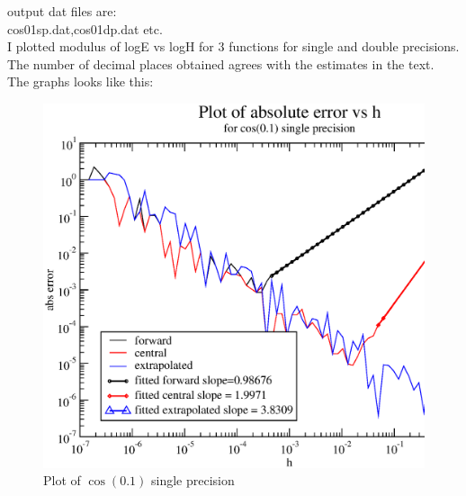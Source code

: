 \documentclass[11pt,a4paper,english]{article}
\begin{document}
	output dat files are:\\
	cos01sp.dat,cos01dp.dat  etc.\\
	I plotted modulus of logE vs logH  for 3 functions for single and double precisions.\\
	The number of decimal places obtained agrees with the estimates in the text.\\
	The graphs looks like this:\\
	
	\begin{figure}[h!]
	\centering
	\includegraphics [scale=0.6]{cos01sp.eps}
	\caption{Plot of $ \cos(0.1)$ single precision }
	\end{figure}
	
\end{document}
